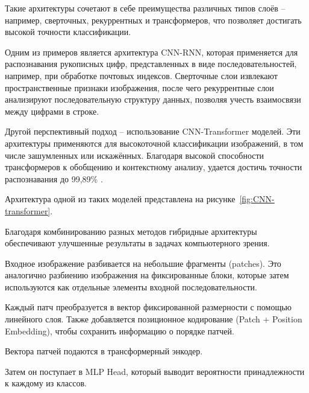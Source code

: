 Такие 
архитектуры сочетают в себе преимущества различных типов слоёв – например, 
сверточных, рекуррентных и трансформеров, что позволяет достигать высокой 
точности классификации.

Одним из примеров является архитектура CNN-RNN, которая применяется для 
распознавания рукописных цифр, представленных в виде последовательностей, 
например, при обработке почтовых индексов. Сверточные слои извлекают 
пространственные признаки изображения, после чего рекуррентные слои 
анализируют последовательную структуру данных, позволяя учесть взаимосвязи 
между цифрами в строке.

Другой перспективный подход – использование CNN-Transformer моделей. Эти 
архитектуры применяются для высокоточной классификации изображений, в том 
числе зашумленных или искажённых. Благодаря высокой способности трансформеров к 
обобщению и контекстному анализу, удается достичь точности распознавания до 
99,89\% \cite{Performance}. 

Архитектура одной из таких моделей представлена на 
рисунке~\ref{fig:CNN-transformer}.

Благодаря комбинированию разных методов гибридные архитектуры обеспечивают 
улучшенные результаты в задачах компьютерного зрения.


Входное изображение разбивается на небольшие фрагменты (patches). Это 
аналогично разбиению изображения на фиксированные блоки, которые затем 
используются как отдельные элементы входной последовательности.

Каждый патч преобразуется в вектор фиксированной размерности с помощью
линейного слоя. Также добавляется позиционное кодирование (Patch + Position 
Embedding), чтобы сохранить информацию о порядке патчей.

Вектора патчей подаются в трансформерный энкодер.

Затем он поступает в MLP Head, который выводит вероятности принадлежности 
к каждому из классов.